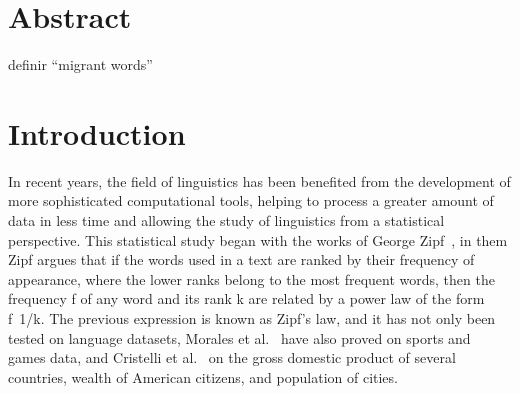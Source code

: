 \documentclass[10pt,letterpaper]{article} %
\begin{document}
\section*{Abstract} %

definir ``migrant words''



\linenumbers
\section*{Introduction} %

 
In recent years, the field of linguistics has been benefited from the
development of more sophisticated computational tools, helping to process a
greater amount of data in less time and allowing the study of linguistics  from
a statistical perspective.  This statistical study began with the works of
George Zipf~\cite{Zipf}, in them Zipf argues that if  the words used in a text
are ranked by their frequency of appearance,  where the lower ranks belong to
the most frequent words,  then the frequency  f  of any word and its rank  k
are related by a power law of the form f~1/k. The previous expression is known
as  Zipf’s law, and it has not only been tested on language datasets,  Morales
et al.~\cite{Morales_epj} have also proved on sports and games data,  and
Cristelli et al.~\cite{Cristelli_zipfgdp} on the gross domestic product of several
countries,  wealth of American citizens,  and population of cities.
 
\end{document}
